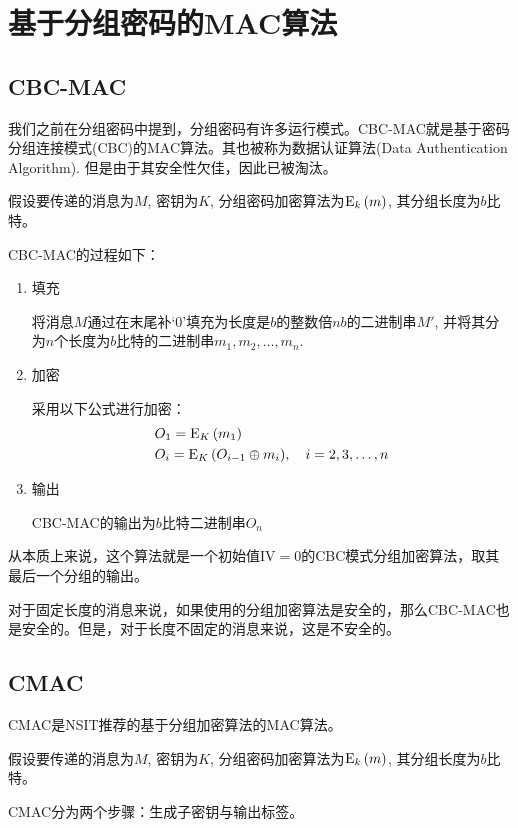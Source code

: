 \section{基于分组密码的MAC算法}
\subsection{CBC-MAC}
我们之前在分组密码中提到，分组密码有许多运行模式。CBC-MAC就是基于密码分组连接模式(CBC)的MAC算法。其也被称为数据认证算法(Data Authentication Algorithm). 但是由于其安全性欠佳，因此已被淘汰。\par
假设要传递的消息为$M$, 密钥为$K$, 分组密码加密算法为${\mathrm{E}_{k}\left({m}\right)}$, 其分组长度为$b$比特。\par
CBC-MAC的过程如下：
\begin{enumerate}
	\item 填充\par
	将消息$M$通过在末尾补`0'填充为长度是$b$的整数倍$nb$的二进制串$M'$, 并将其分为$n$个长度为$b$比特的二进制串$m_1, m_2, \ldots, m_n$.
	\item 加密\par
	采用以下公式进行加密：
	\begin{align*}
	&O_1={\mathrm{E}_{K}\left({m_1}\right)}\\
	&O_{i}={\mathrm{E}_{K}\left({O_{i-1}\oplus m_{i}}\right)},\quad i=2, 3,\ldots, n
	\end{align*}
	\item 输出\par
	CBC-MAC的输出为$b$比特二进制串$O_n$
\end{enumerate}

从本质上来说，这个算法就是一个初始值$\mathrm{IV}=0$的CBC模式分组加密算法，取其最后一个分组的输出。\par
对于固定长度的消息来说，如果使用的分组加密算法是安全的，那么CBC-MAC也是安全的。但是，对于长度不固定的消息来说，这是不安全的。
\subsection{CMAC}
CMAC是NSIT推荐的基于分组加密算法的MAC算法。\par
假设要传递的消息为$M$, 密钥为$K$, 分组密码加密算法为${\mathrm{E}_{k}\left({m}\right)}$, 其分组长度为$b$比特。\par
CMAC分为两个步骤：生成子密钥与输出标签。
